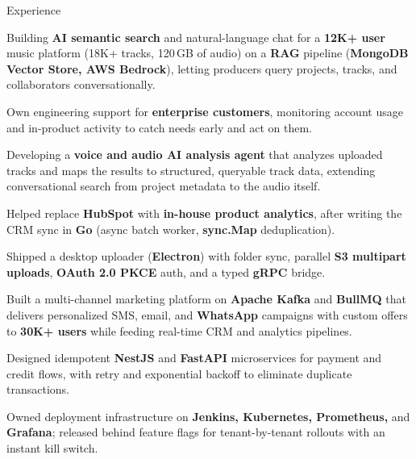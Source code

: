 \documentclass{resume}
\begin{document}
\begin{rSection}{Experience}
\begin{jobitems}
    \item Building \textbf{AI semantic search} and natural-language chat for a \textbf{12K+ user} music platform (18K+ tracks, 120\,GB of audio) on a \textbf{RAG} pipeline (\textbf{MongoDB Vector Store, AWS Bedrock}), letting producers query projects, tracks, and collaborators conversationally.
    \item Own engineering support for \textbf{enterprise customers}, monitoring account usage and in-product activity to catch needs early and act on them.
    \item Developing a \textbf{voice and audio AI analysis agent} that analyzes uploaded tracks and maps the results to structured, queryable track data, extending conversational search from project metadata to the audio itself.
    \item Helped replace \textbf{HubSpot} with \textbf{in-house product analytics}, after writing the CRM sync in \textbf{Go} (async batch worker, \textbf{sync.Map} deduplication).
    \item Shipped a desktop uploader (\textbf{Electron}) with folder sync, parallel \textbf{S3 multipart uploads}, \textbf{OAuth 2.0 PKCE} auth, and a typed \textbf{gRPC} bridge.
\end{jobitems}

\begin{jobitems}
    \item Built a multi-channel marketing platform on \textbf{Apache Kafka} and \textbf{BullMQ} that delivers personalized SMS, email, and \textbf{WhatsApp} campaigns with custom offers to \textbf{30K+ users} while feeding real-time CRM and analytics pipelines.
    \item Designed idempotent \textbf{NestJS} and \textbf{FastAPI} microservices for payment and credit flows, with retry and exponential backoff to eliminate duplicate transactions.
    \item Owned deployment infrastructure on \textbf{Jenkins, Kubernetes, Prometheus,} and \textbf{Grafana}; released behind feature flags for tenant-by-tenant rollouts with an instant kill switch.
\end{jobitems}


\end{rSection}
\end{document}
